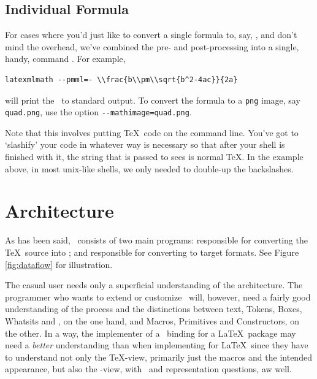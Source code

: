 \documentclass{book}
\newcommand{\shellcode}{\lstinline[style=shell]}
\begin{document}
\section{Individual Formula}\label{usage.latexmlmath}
For cases where you'd just like to convert a single formula to, say, \MathML,
and don't mind the overhead, we've combined the pre- and post-processing into
a single, handy, command .  For example,
\begin{lstlisting}[style=shell]
  latexmlmath --pmml=- \\frac{b\\pm\\sqrt{b^2-4ac}}{2a}
\end{lstlisting}
will print the \MathML\ to standard output.  
To convert the formula to a \texttt{png} image, say \texttt{quad.png},
use the option \shellcode{--mathimage=quad.png}.

Note that this involves putting \TeX\ code on the command line.
You've got to `slashify' your code in whatever way is necessary
so that after your shell is finished with it, the string that
is passed to  sees is normal \TeX.  In the
example above, in most unix-like shells, we only needed to
double-up the backslashes.

\chapter{Architecture}\label{architecture}
As has been said, \LaTeXML\ consists of two main programs:
 responsible for converting the \TeX\ source into \XML;
and  responsible for converting to target formats.
See Figure \ref{fig:dataflow} for illustration.

The casual user needs only a superficial understanding of the architecture.
The programmer who wants to extend or customize \LaTeXML\ will, however,
need a fairly good understanding of the process and the distinctions between
text, Tokens, Boxes, Whatsits and \XML, on the one hand,
and Macros, Primitives and Constructors, on the other.
In a way, the implementer of a \LaTeXML\ binding for a \LaTeX\ package may
need a \emph{better} understanding than when implementing for \LaTeX\
since they have to understand not only the \TeX-view, primarily just the macros
and the intended appearance, but also the \LaTeXML-view, with \XML\
and representation questions, aw well.
\end{document}
